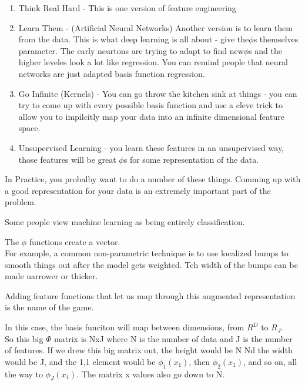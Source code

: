 \documentclass[12pt]{article}   	%
\begin{document}
\begin{enumerate}
\item Think Real Hard - This is one version of feature engineering
\item Learn Them - (Artificial Neural Networks) Another version is to learn them from the data. This is what deep learning is all about - give the$\phi$s themselves parameter. The early neurtons are trying to adapt to find new$\phi$s and the higher leveles look a lot like regression. You can remind people that neural networks are just adapted basis function regression. 
\item Go Infinite (Kernels) - You can go throw the kitchen sink at things - you can try to come up with every possible basis function and use a cleve trick to allow you to impilcitly map your data into an infinite dimensional feature space. 
\item Unsupervised Learning -  you learn these features in an unsupervised way, those features will be great $\phi$s for some representation of the data.
\end{enumerate}

\noindent
In Practice, you probalby want to do a number of these things. Comming up with a good representation for your data is an extremely important part of the problem. 

\noindent
Some people view machine learning as being entirely classification. 

\noindent
The $\phi$ functions create a vector.\\

\noindent
For example, a common non-parametric technique is to use localized bumps to smooth things out after the model gets weighted. Teh width of the bumps can be made narrower or thicker. 

\noindent
Adding feature functions that let us map through this augmented representation is the name of the game.

\noindent
In this case, the basis funciton will map between dimensions, from $R^{D}$ to $R_{J}$.\\

\noindent
So this big $\Phi$ matrix is NxJ where N is the number of data and J is the number of features. If we drew this big matrix out, the height would be N Nd the width would be J, and the 1,1 element would be $\phi_{1}(x_{1})$, then $\phi_{2}(x_{1})$, and so on, all the way to $\phi_{J}(x_{1})$. The matrix x values also go down to N. \\
\end{document}
